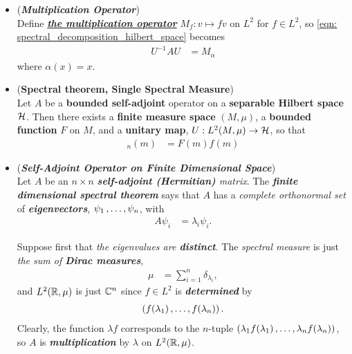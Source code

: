 \documentclass[11pt]{article}
\begin{document}
\begin{itemize}
\item \begin{remark} (\textbf{\emph{Multiplication Operator}}) \\
Define \underline{\emph{\textbf{the multiplication operator}}} $M_f: v \mapsto f v$ on $L^2$ for $f \in L^2$, so \eqref{eqn: spectral_decomposition_hilbert_space} becomes
\begin{align}
U^{-1} A U  &= M_{\alpha} \label{eqn: spectral_decomposition_hilbert_space_multiplication_operator}
\end{align} where $\alpha(x) = x$.
\end{remark}

\item \begin{corollary} (\textbf{Spectral theorem, Single Spectral Measure})   \citep{reed1980methods}\\
Let $A$ be a \textbf{bounded self-adjoint} operator on a \textbf{separable Hilbert space} ${\mathcal H}$. Then there exists a \textbf{finite measure space} $(M, \mu)$, a \textbf{bounded  function} $F$ on $M$, and a \textbf{unitary map}, $U:  L^2(M, \mu) \rightarrow {\mathcal H}$, so that 
\begin{align*}
[U^{-1} A U f]_n(m) &= F(m)  f(m)
\end{align*} 
\end{corollary}



\item \begin{example} (\emph{\textbf{Self-Adjoint Operator on Finite Dimensional Space}})\\
Let $A$ be an $n \times n$ \emph{\textbf{self-adjoint (Hermitian)} matrix}. The \emph{\textbf{finite dimensional spectral theorem}} says that $A$ has a \emph{complete orthonormal set} of \emph{\textbf{eigenvectors}}, $\psi_1 \,{,}\ldots{,}\, \psi_n$, with
\begin{align*}
A \psi_i &= \lambda_i \psi_i.
\end{align*}

Suppose first that \emph{the eigenvalues are \textbf{distinct}}. The \emph{spectral measure} is just \emph{the sum of \textbf{Dirac measures}}, 
\begin{align}
\mu &= \sum_{i=1}^{n}\delta_{\lambda_i}, \label{eqn: spectral_measure_finite_dim}
\end{align}
and $L^2({\mathbb R},\mu)$ is just ${\mathbb C}^{n}$ since $f \in L^2$ is \emph{\textbf{determined}} by 
\begin{align*}
 \left(f(\lambda_1) \,{,}\ldots{,}\, f(\lambda_n)\right).
\end{align*}
Clearly, the function $\lambda f$ corresponds to the $n$-tuple $\left(\lambda_1 f(\lambda_1) \,{,}\ldots{,}\, \lambda_n f(\lambda_n)\right)$, 
so $A$ is \emph{\textbf{multiplication}} by $\lambda$ on $L^2({\mathbb R},\mu)$. 


\end{example}
\end{itemize}
\end{document}
